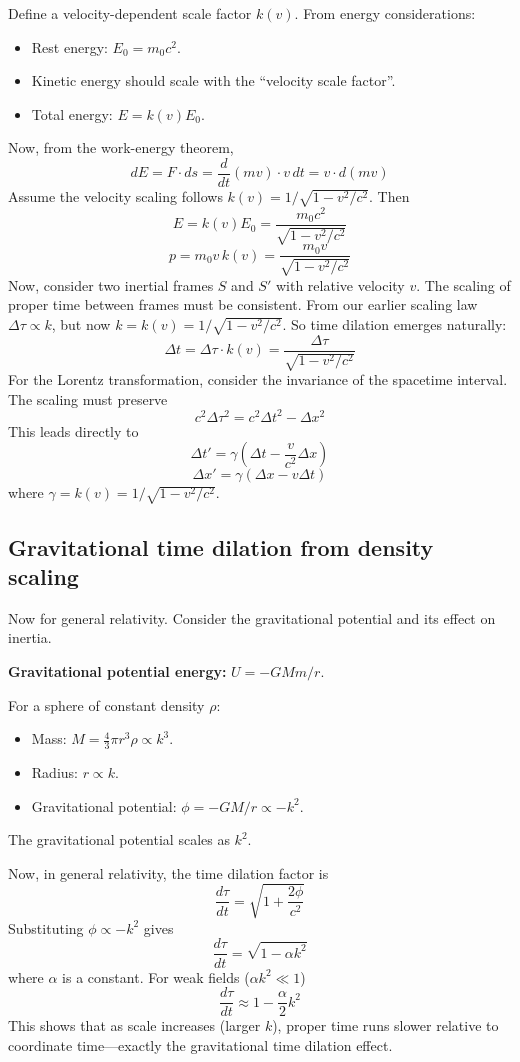 Define a velocity-dependent scale factor $k(v)$. From energy considerations:
\begin{itemize}[leftmargin=0.5cm]
    \item Rest energy: $E_0 = m_0 c^2$.
    \item Kinetic energy should scale with the ``velocity scale factor''.
    \item Total energy: $E = k(v) E_0$.
\end{itemize}
Now, from the work-energy theorem,
\[
 dE = F \cdot ds = \frac{d}{dt}(mv) \cdot v\, dt = v \cdot d(mv)
\]
Assume the velocity scaling follows $k(v) = 1/\sqrt{1 - v^2/c^2}$.
Then
\[
 E = k(v) E_0 = \frac{m_0 c^2}{\sqrt{1 - v^2/c^2}}
\]
\[
 p = m_0 v\, k(v) = \frac{m_0 v}{\sqrt{1 - v^2/c^2}}
\]
Now, consider two inertial frames $S$ and $S'$ with relative velocity $v$. The scaling of proper time between frames must be consistent. From our earlier scaling law $\Delta\tau \propto k$, but now $k = k(v) = 1/\sqrt{1 - v^2/c^2}$. So time dilation emerges naturally:
\[
 \Delta t = \Delta\tau \cdot k(v) = \frac{\Delta\tau}{\sqrt{1 - v^2/c^2}}
\]
For the Lorentz transformation, consider the invariance of the spacetime interval. The scaling must preserve
\[
 c^2 \Delta\tau^2 = c^2 \Delta t^2 - \Delta x^2
\]
This leads directly to
\[
 \Delta t' = \gamma\left(\Delta t - \frac{v}{c^2}\Delta x\right)
\]
\[
 \Delta x' = \gamma(\Delta x - v\Delta t)
\]
where $\gamma = k(v) = 1/\sqrt{1 - v^2/c^2}$.

\subsection{Gravitational time dilation from density scaling}
Now for general relativity. Consider the gravitational potential and its effect on inertia.

\textbf{Gravitational potential energy:} $U = -GMm/r$.

For a sphere of constant density $\rho$:
\begin{itemize}[leftmargin=0.5cm]
    \item Mass: $M = \tfrac{4}{3}\pi r^3 \rho \propto k^3$.
    \item Radius: $r \propto k$.
    \item Gravitational potential: $\phi = -GM/r \propto -k^2$.
\end{itemize}
The gravitational potential scales as $k^2$.

Now, in general relativity, the time dilation factor is
\[
 \frac{d\tau}{dt} = \sqrt{1 + \frac{2\phi}{c^2}}
\]
Substituting $\phi \propto -k^2$ gives
\[
 \frac{d\tau}{dt} = \sqrt{1 - \alpha k^2}
\]
where $\alpha$ is a constant. For weak fields ($\alpha k^2 \ll 1$)
\[
 \frac{d\tau}{dt} \approx 1 - \frac{\alpha}{2}k^2
\]
This shows that as scale increases (larger $k$), proper time runs slower relative to coordinate time---exactly the gravitational time dilation effect.

